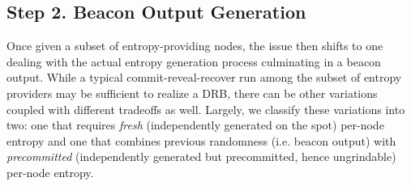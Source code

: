 \documentclass[letterpaper,twocolumn,10pt]{article}
\theoremstyle{definition}
\theoremstyle{remark}
\begin{document}
\subsection{Step 2. Beacon Output Generation}
\label{subsection:beacon-output-generation}
Once given a subset of entropy-providing nodes, the issue then shifts to one dealing with the actual entropy generation process culminating in a beacon output. While a typical commit-reveal-recover run among the subset of entropy providers may be sufficient to realize a DRB, there can be other variations coupled with different tradeoffs as well. Largely, we classify these variations into two: one that requires \textit{fresh} (independently generated on the spot) per-node entropy and one that combines previous randomness (i.e. beacon output) with \textit{precommitted} (independently generated but precommitted, hence ungrindable) per-node entropy.
\end{document}
